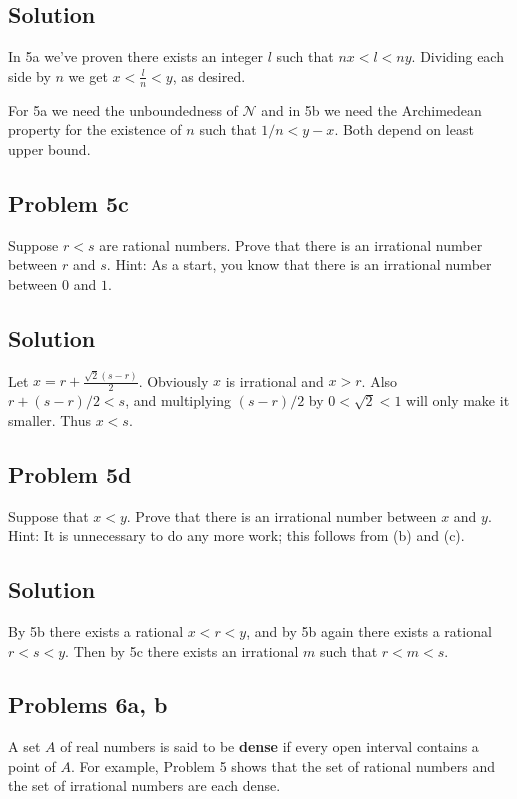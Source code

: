 \subsection*{Solution}
In 5a we've proven there exists an integer $l$ such that $nx<l<ny$.
Dividing each side by $n$ we get $x<\frac{l}{n}<y$, as desired.

\vs

For 5a we need the unboundedness of $\mathcal{N}$ and in 5b we need the
Archimedean property for the existence of $n$ such that $1/n<y-x$.
Both depend on least upper bound.

\subsection*{Problem 5c}
Suppose $r<s$ are rational numbers. Prove that there is an irrational
number between $r$ and $s$. Hint: As a start, you know that there is
an irrational number between $0$ and $1$.

\subsection*{Solution}
Let $x=r+\frac{\sqrt{2}(s-r)}{2}$. Obviously $x$ is irrational and
$x>r$. Also $r+(s-r)/2<s$, and multiplying $(s-r)/2$ by $0<\sqrt{2}<1$
will only make it smaller. Thus $x<s$.

\subsection*{Problem 5d}
Suppose that $x<y$. Prove that there is an irrational number between
$x$ and $y$. Hint: It is unnecessary to do any more work; this follows
from (b) and (c).

\subsection*{Solution}
By 5b there exists a rational $x<r<y$, and by 5b again there exists a
rational $r<s<y$. Then by 5c there exists an irrational $m$ such that
$r<m<s$.

\subsection*{Problems 6a, b}
A set $A$ of real numbers is said to be \textbf{dense} if every open
interval contains a point of $A$. For example, Problem 5 shows that
the set of rational numbers and the set of irrational numbers are each
dense.

